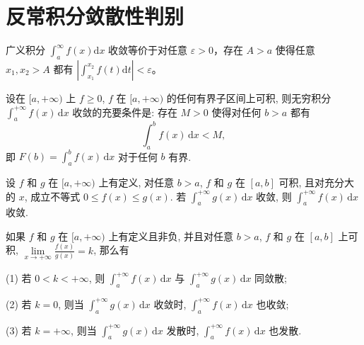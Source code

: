 \documentclass[../../main.tex]{subfiles}%
\begin{document}
\section{反常积分敛散性判别}

\begin{theorem}[Cauchy收敛准则]
广义积分 \(\int_{a}^{\infty} f(x) \mathrm{d}x\) 收敛等价于对任意 \(\varepsilon > 0\)，存在 \(A > a\) 使得任意 \(x_1,x_2 > A\) 都有 \(\left|\int_{x_1}^{x_2} f(t) \mathrm{d}t\right| < \varepsilon\)。 
\end{theorem}

\begin{theorem}
设在 $[a, +\infty)$ 上 $f \geqslant 0$, $f$ 在 $[a, +\infty)$ 的任何有界子区间上可积, 则无穷积分 $\int_a^{+\infty} f(x) \, \mathrm{d}x$ 收敛的充要条件是: 存在 $M > 0$ 使得对任何 $b > a$ 都有
\[
\int_a^b f(x) \, \mathrm{d}x < M,
\]
即 $F(b) = \int_a^b f(x) \, \mathrm{d}x$ 对于任何 $b$ 有界.
\end{theorem}

\begin{theorem}[比较判别法]
设 \( f \) 和 \( g \) 在 \([a, +\infty)\) 上有定义, 对任意 \( b > a \), \( f \) 和 \( g \) 在 \([a, b]\) 可积, 且对充分大的 \( x \), 成立不等式 \( 0 \leqslant f(x) \leqslant g(x) \). 若 \( \int_a^{+\infty} g(x) \, \mathrm{d}x \) 收敛, 则 \( \int_a^{+\infty} f(x) \, \mathrm{d}x \) 收敛.
\end{theorem}

\begin{theorem}[比较判别法极限形式]
如果 \( f \) 和 \( g \) 在 \([a, +\infty)\) 上有定义且非负, 并且对任意 \( b > a \), \( f \) 和 \( g \) 在 \([a, b]\) 上可积, \( \lim\limits_{x \to +\infty} \frac{f(x)}{g(x)} = k \), 那么有

(1) 若 \( 0 < k < +\infty \), 则 \( \int_a^{+\infty} f(x) \, \mathrm{d}x \) 与 \( \int_a^{+\infty} g(x) \, \mathrm{d}x \) 同敛散;

(2) 若 \( k = 0 \), 则当 \( \int_a^{+\infty} g(x) \, \mathrm{d}x \) 收敛时, \( \int_a^{+\infty} f(x) \, \mathrm{d}x \) 也收敛;

(3) 若 \( k = +\infty \), 则当 \( \int_a^{+\infty} g(x) \, \mathrm{d}x \) 发散时, \( \int_a^{+\infty} f(x) \, \mathrm{d}x \) 也发散.
\end{theorem}
\end{document}
